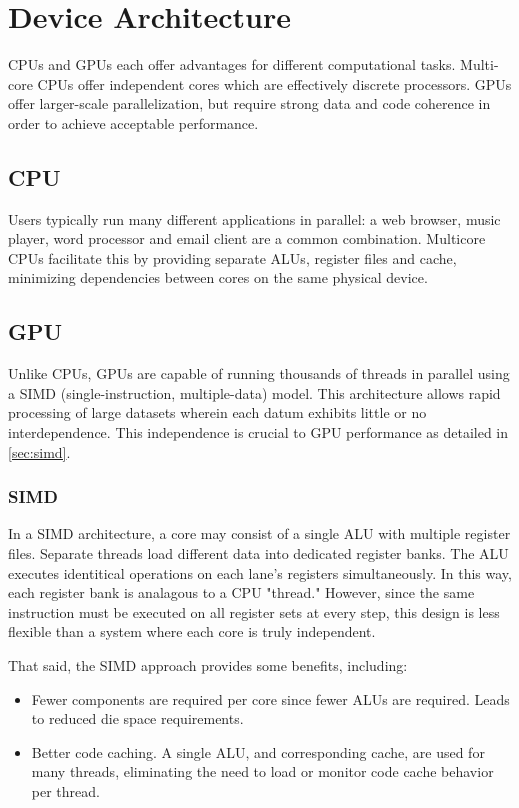 \chapter{Device Architecture} \label{ch:device architecture}

CPUs and GPUs each offer advantages for different computational tasks. Multi-core CPUs offer independent cores which are effectively discrete processors. GPUs offer larger-scale parallelization, but require strong data and code coherence in order to achieve acceptable performance.

\section{CPU}

Users typically run many different applications in parallel: a web browser, music player, word processor and email client are a common combination. Multicore CPUs facilitate this by providing separate ALUs, register files and cache, minimizing dependencies between cores on the same physical device. 

\section{GPU}

Unlike CPUs, GPUs are capable of running thousands of threads in parallel using a SIMD (single-instruction, multiple-data) model. This architecture allows rapid processing of large datasets wherein each datum exhibits little or no interdependence.  This independence is crucial to GPU performance as detailed in \autoref{sec:simd}.

\subsection{SIMD}\label{sec:simd}

In a SIMD\cite{Massingill:2007:SAP:1772070.1772078} architecture, a core may consist of a single ALU with multiple register files. Separate threads load different data into dedicated register banks. The ALU executes identitical operations on each lane's registers simultaneously. In this way, each register bank is analagous to a CPU "thread." However, since the same instruction must be executed on all register sets at every step, this design is less flexible than a system where each core is truly independent. 

That said, the SIMD approach provides some benefits, including:

\begin{itemize}
	\item Fewer components are required per core since fewer ALUs are required. Leads to reduced die space requirements.
	\item Better code caching. A single ALU, and corresponding cache, are used for many threads, eliminating the need to load or monitor code cache behavior per thread.
\end{itemize}





